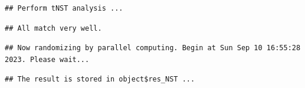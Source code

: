 \documentclass[
]{book}
\newenvironment{Shaded}{\begin{snugshade}}{\end{snugshade}}
\newcommand{\AttributeTok}[1]{\textcolor[rgb]{0.77,0.63,0.00}{#1}}
\newcommand{\CommentTok}[1]{\textcolor[rgb]{0.56,0.35,0.01}{\textit{#1}}}
\newcommand{\ConstantTok}[1]{\textcolor[rgb]{0.00,0.00,0.00}{#1}}
\newcommand{\FunctionTok}[1]{\textcolor[rgb]{0.00,0.00,0.00}{#1}}
\newcommand{\NormalTok}[1]{#1}
\newcommand{\SpecialCharTok}[1]{\textcolor[rgb]{0.00,0.00,0.00}{#1}}
\newcommand{\StringTok}[1]{\textcolor[rgb]{0.31,0.60,0.02}{#1}}
\begin{document}
\begin{Shaded}
\end{Shaded}

\begin{verbatim}
## Perform tNST analysis ...
\end{verbatim}

\begin{verbatim}
## All match very well.
\end{verbatim}

\begin{verbatim}
## Now randomizing by parallel computing. Begin at Sun Sep 10 16:55:28 2023. Please wait...
\end{verbatim}

\begin{verbatim}
## The result is stored in object$res_NST ...
\end{verbatim}
\end{document}
